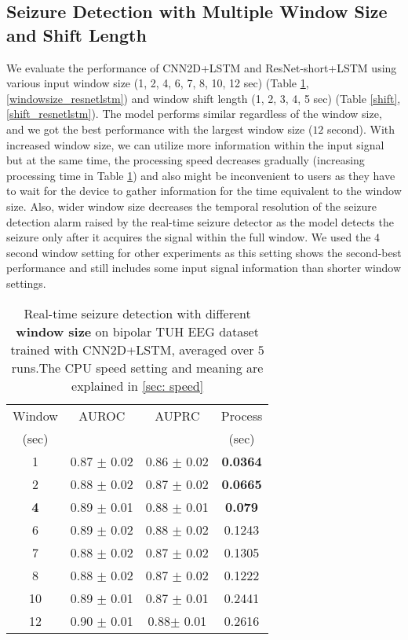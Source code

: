 \documentclass[pmlr,twocolumn,10pt]{jmlr}
\begin{document}
\subsection{Seizure Detection with Multiple Window Size and Shift Length}
\label{sec:windowshift}
We evaluate the performance of CNN2D+LSTM and ResNet-short+LSTM using various input window size (1, 2, 4, 6, 7, 8, 10, 12 sec) (Table \ref{windowsize}, \ref{windowsize_resnetlstm}) and window shift length (1, 2, 3, 4, 5 sec) (Table \ref{shift}, \ref{shift_resnetlstm}). The model performs similar regardless of the window size, and we got the best performance with the largest window size ($12$ second). With increased window size, we can utilize more information within the input signal but at the same time, the processing speed decreases gradually (increasing processing time in Table \ref{windowsize}) and also might be inconvenient to users as they have to wait for the device to gather information for the time equivalent to the window size. Also, wider window size decreases the temporal resolution of the seizure detection alarm raised by the real-time seizure detector as the model detects the seizure only after it acquires the signal within the full window. We used the $4$ second window setting for other experiments as this setting shows the second-best performance and still includes some input signal information than shorter window settings.
\begin{table}[h!]
    \small
	\centering
	\caption{Real-time seizure detection with different \textbf{window size} on  bipolar TUH EEG dataset trained with CNN2D+LSTM, averaged over $5$ runs.The CPU speed setting and meaning are explained in \ref{sec: speed}}
	\label{windowsize}
	\begin{tabular}{c|ccc}
		\toprule
		Window & AUROC & AUPRC & Process\\
		(sec) &&& (sec)\\
		\midrule
		1 & 0.87 $\pm$ 0.02 & 0.86 $\pm$ 0.02 & \textbf{0.0364} \\
		2  & 0.88 $\pm$ 0.02 & 0.87 $\pm$ 0.02  & \textbf{0.0665} \\
		\textbf{4} & 0.89 $\pm$ 0.01 & 0.88 $\pm$ 0.01 & \textbf{0.079}\\
		6  & 0.89 $\pm$ 0.02 & 0.88 $\pm$ 0.02 & 0.1243 \\
		7  & 0.88 $\pm$ 0.02 & 0.87 $\pm$ 0.02 & 0.1305 \\
		8  & 0.88 $\pm$ 0.02 & 0.87 $\pm$ 0.02 & 0.1222 \\
		10  & 0.89 $\pm$ 0.01 & 0.87 $\pm$ 0.01 & 0.2441 \\
		12  & 0.90 $\pm$ 0.01 & 0.88$\pm$ 0.01  & 0.2616 \\
		\bottomrule
	\end{tabular}
\end{table}
\end{document}
